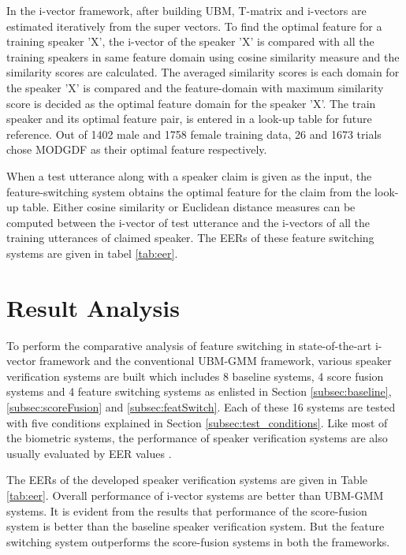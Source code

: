 \documentclass{article}
\begin{document}
In the i-vector framework, after building UBM, T-matrix and i-vectors are estimated iteratively from the super vectors. To find the optimal feature for a training speaker 'X', the i-vector of the speaker 'X' is compared with all the training speakers in same feature domain using cosine similarity measure and the similarity scores are calculated. The averaged similarity scores is each domain for the speaker 'X' is compared and the feature-domain with maximum similarity score is decided as the optimal feature domain for the speaker 'X'. The train speaker and its optimal feature pair, is entered in a look-up table for future reference. Out of 1402 male and 1758 female training data, 26 and 1673 trials chose MODGDF as their optimal feature respectively.

When a test utterance along with a speaker claim is given as the input, the feature-switching system obtains the optimal feature for the claim from the look-up table. Either cosine similarity or Euclidean distance measures can be computed between the i-vector of test utterance and the i-vectors of all the training utterances of claimed speaker. The EERs of these feature switching systems are given in tabel \ref{tab:eer}.

\section{Result Analysis}
\label{sec:resAnalysis}

To perform the comparative analysis of feature switching in state-of-the-art i-vector framework and the conventional UBM-GMM framework, various speaker verification systems are built which includes 8 baseline systems, 4 score fusion systems and 4 feature switching systems as enlisted in Section \ref{subsec:baseline}, \ref{subsec:scoreFusion} and \ref{subsec:featSwitch}. Each of these 16 systems are tested with five conditions explained in Section \ref{subsec:test_conditions}. Like most of the biometric systems, the performance of  speaker verification systems are also usually evaluated by EER values \cite{eer1}. 

\vspace{0.25cm}
The EERs of the developed speaker verification systems are given in Table \ref{tab:eer}. Overall performance of i-vector systems are better than UBM-GMM systems. It is evident from the results that performance of the score-fusion system is better than the baseline speaker verification system. But the feature switching system outperforms the score-fusion systems in both the frameworks. 
\end{document}
